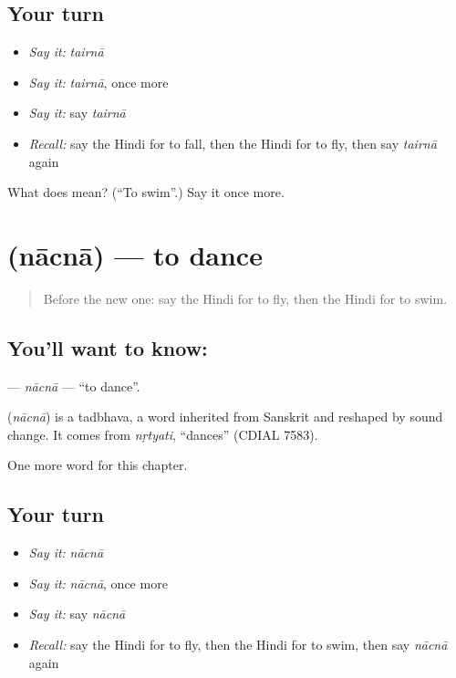 \subsection*{Your turn}
\begin{itemize}
\raggedright
  \item \emph{Say it:} \emph{tairnā}
  \item \emph{Say it:} \emph{tairnā}, once more
  \item \emph{Say it:} say \emph{tairnā}
  \item \emph{Recall:} say the Hindi for to fall, then the Hindi for to fly, then say \emph{tairnā} again
\end{itemize}

\begin{tcolorbox}[breakable,colback=teal!4,colframe=teal!35!black,title={Before you move on}]
What does  mean? (\textquotedblleft{}To swim\textquotedblright{}.) Say it once more.
\end{tcolorbox}
\section[\texorpdfstring{\hi{नाचना} (nācnā)}{नाचना (nācnā)}]{ (nācnā) — to dance}

\label{lesson:HI-C162-nacna}



\begin{quote}
Before the new one: say the Hindi for to fly, then the Hindi for to swim.
\end{quote}

\subsection*{You'll want to know: }
\textbf{} — \emph{nācnā} — \textquotedblleft{}to dance\textquotedblright{}.

\begin{cousinweb}
\textbf{} (\emph{nācnā}) is a tadbhava, a word inherited from Sanskrit and reshaped by sound change. It comes from \emph{nṛtyati}, \textquotedblleft{}dances\textquotedblright{} (CDIAL 7583).
\end{cousinweb}

\begin{grammarlens}[title={What you've built}]
One more word for this chapter.
\end{grammarlens}

\subsection*{Your turn}
\begin{itemize}
\raggedright
  \item \emph{Say it:} \emph{nācnā}
  \item \emph{Say it:} \emph{nācnā}, once more
  \item \emph{Say it:} say \emph{nācnā}
  \item \emph{Recall:} say the Hindi for to fly, then the Hindi for to swim, then say \emph{nācnā} again
\end{itemize}

